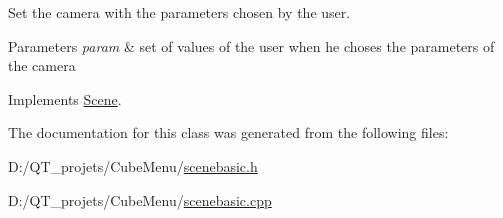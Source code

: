 Set the camera with the parameters chosen by the user. 


\begin{DoxyParams}{Parameters}
{\em param} & set of values of the user when he choses the parameters of the camera \\
\hline
\end{DoxyParams}


Implements \hyperlink{class_scene_a52181459b75a0c2f4706a26f3e200ca1}{Scene}.



The documentation for this class was generated from the following files\+:\begin{DoxyCompactItemize}
\item 
D\+:/\+Q\+T\+\_\+projets/\+Cube\+Menu/\hyperlink{scenebasic_8h}{scenebasic.\+h}\item 
D\+:/\+Q\+T\+\_\+projets/\+Cube\+Menu/\hyperlink{scenebasic_8cpp}{scenebasic.\+cpp}\end{DoxyCompactItemize}
